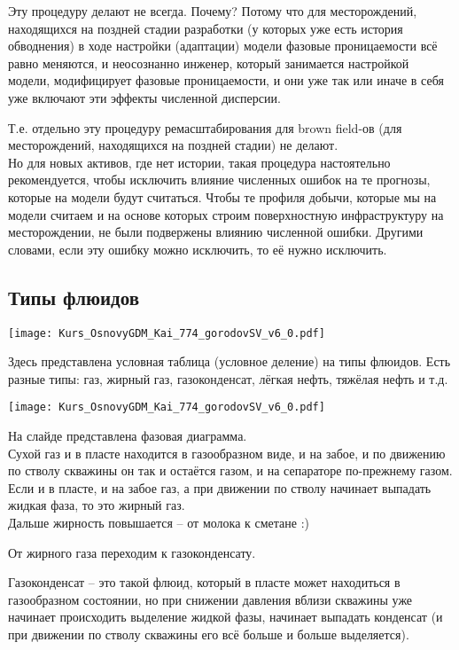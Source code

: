 \documentclass[main.tex]{subfiles}
\begin{document}
Эту процедуру делают не всегда.
Почему?
Потому что для месторождений, находящихся на поздней стадии разработки (у которых уже есть история обводнения) в ходе настройки (адаптации) модели фазовые проницаемости всё равно меняются, и неосознанно инженер, который занимается настройкой модели, модифицирует фазовые проницаемости, и они уже так или иначе в себя уже включают эти эффекты численной дисперсии.

Т.е. отдельно эту процедуру ремасштабирования для brown field-ов (для месторождений, находящихся на поздней стадии) не делают.
\\

Но для новых активов, где нет истории, такая процедура настоятельно рекомендуется, чтобы исключить влияние численных ошибок на те прогнозы, которые на модели будут считаться.
Чтобы те профиля добычи, которые мы на модели считаем и на основе которых строим поверхностную инфраструктуру на месторождении, не были подвержены влиянию численной ошибки.
Другими словами, если эту ошибку можно исключить, то её нужно исключить.

\subsection{Типы флюидов}

\texttt{[image: Kurs\_OsnovyGDM\_Kai\_774\_gorodovSV\_v6\_0.pdf]}

Здесь представлена условная таблица (условное деление) на типы флюидов.
Есть разные типы: газ, жирный газ, газоконденсат, лёгкая нефть, тяжёлая нефть и т.д.

\texttt{[image: Kurs\_OsnovyGDM\_Kai\_774\_gorodovSV\_v6\_0.pdf]}

На слайде представлена фазовая диаграмма.
\\

Сухой газ и в пласте находится в газообразном виде, и на забое, и по движению по стволу скважины он так и остаётся газом, и на сепараторе по-прежнему газом.
\\

Если и в пласте, и на забое газ, а при движении по стволу начинает выпадать жидкая фаза, то это жирный газ.
\\

Дальше жирность повышается -- от молока к сметане :)

От жирного газа переходим к газоконденсату.

Газоконденсат -- это такой флюид, который в пласте может находиться в газообразном состоянии, но при снижении давления вблизи скважины уже начинает происходить выделение жидкой фазы, начинает выпадать конденсат (и при движении по стволу скважины его всё больше и больше выделяется).
\\
\end{document}
